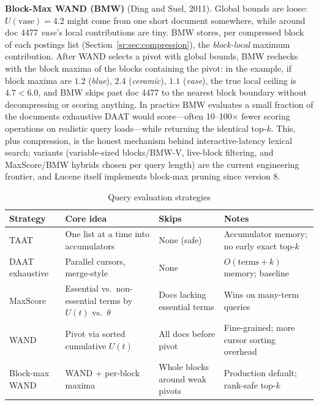 \textbf{Block-Max WAND (BMW)} (Ding and Suel, 2011). Global bounds are loose: $U(\text{vase}) = 4.2$ might come from one short document somewhere, while around doc 4477 \emph{vase}'s local contributions are tiny. BMW stores, per compressed block of each postings list (Section~\ref{sr:sec:compression}), the \emph{block-local} maximum contribution. After WAND selects a pivot with global bounds, BMW rechecks with the block maxima of the blocks containing the pivot: in the example, if block maxima are $1.2$ (\emph{blue}), $2.4$ (\emph{ceramic}), $1.1$ (\emph{vase}), the true local ceiling is $4.7 < 6.0$, and BMW skips past doc 4477 to the nearest block boundary without decompressing or scoring anything. In practice BMW evaluates a small fraction of the documents exhaustive DAAT would score---often 10--100$\times$ fewer scoring operations on realistic query loads---while returning the identical top-$k$. This, plus compression, is the honest mechanism behind interactive-latency lexical search; variants (variable-sized blocks/BMW-V, live-block filtering, and MaxScore/BMW hybrids chosen per query length) are the current engineering frontier, and Lucene itself implements block-max pruning since version 8.

\begin{table}[H]
\centering
\caption{Query evaluation strategies}
\label{sr:tab:query_eval}
\begin{tabularx}{\textwidth}{lXXX}
\toprule
\textbf{Strategy} & \textbf{Core idea} & \textbf{Skips} & \textbf{Notes} \\
\midrule
TAAT & One list at a time into accumulators & None (safe) & Accumulator memory; no early exact top-$k$ \\
DAAT exhaustive & Parallel cursors, merge-style & None & $O(\text{terms}+k)$ memory; baseline \\
MaxScore & Essential vs.\ non-essential terms by $U(t)$ vs.\ $\theta$ & Docs lacking essential terms & Wins on many-term queries \\
WAND & Pivot via sorted cumulative $U(t)$ & All docs before pivot & Fine-grained; more cursor sorting overhead \\
Block-max WAND & WAND + per-block maxima & Whole blocks around weak pivots & Production default; rank-safe top-$k$ \\
\bottomrule
\end{tabularx}
\end{table}

